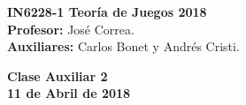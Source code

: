 \documentclass[11pt, spanish]{article}
\theoremstyle{plain}
\begin{document}

\begin{flushleft}
  \textbf{IN6228-1 Teoría de Juegos 2018}
  \\\textbf{Profesor:} José Correa.
  \\\textbf{Auxiliares:} Carlos Bonet y Andrés Cristi.
\end{flushleft}


\begin{center}
  \large{\textbf{Clase Auxiliar 2\\ 11 de Abril de 2018}}
\end{center}

\end{document}
